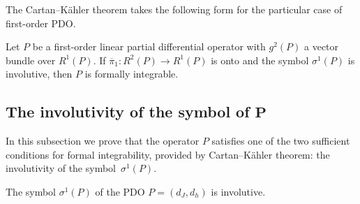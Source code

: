 The Cartan--K\"ahler theorem \cite{grifone00} takes the following form
for the particular case of f\/irst-order PDO.

\begin{theorem}
Let $P$ be a first-order linear partial differential operator with
$g^{2}(P)$ a vector bundle over $R^{1}(P)$. If $\overline{\pi}_{1}:R^{2}(P)\to R^{1}(P)$
is onto and the symbol $\sigma^{1}(P)$ is involutive, then $P$ is
formally integrable.
\end{theorem}

\subsection[The involutivity of the symbol of $P$]{The involutivity of the symbol of $\boldsymbol{P}$}

In this subsection we prove that the operator $P$ satisf\/ies one of
the two suf\/f\/icient conditions for formal integrability, provided by
Cartan--K\"ahler theorem: the involutivity of the symbol~$\sigma^{1}(P)$.

\begin{theorem}\label{thm:-involutivity}
The symbol $\sigma^{1}(P)$ of the PDO
$P=(d_{J},d_{h})$ is involutive.
\end{theorem}

